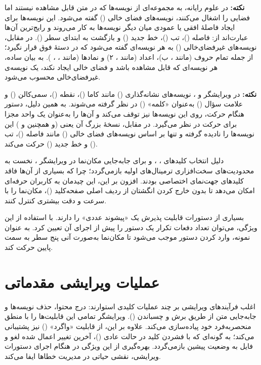 \begin{note}
\textbf{نکته:} در علوم رایانه، به مجموعه‌ای از نویسه‌ها که در متن قابل مشاهده نیستند اما فضایی را اشغال می‌کنند، نویسه‌های فضای خالی () گفته می‌شود. این نویسه‌ها برای ایجاد فاصلهٔ افقی یا عمودی میان دیگر نویسه‌ها به کار می‌روند و رایج‌ترین آن‌ها عبارت‌اند از: فاصله ()، تب ()، خط جدید () و بازگشت به ابتدای سطر (). در مقابل، نویسه‌های غیرفضای‌خالی () به هر نویسه‌ای گفته می‌شود که در دستهٔ فوق قرار نگیرد؛ از جمله تمام حروف (مانند ، ب)، اعداد (مانند ، ۲) و نمادها (مانند ، \cmd{\#}، ). به بیان ساده، هر نویسه‌ای که قابل مشاهده باشد و فضای خالی ایجاد نکند، یک نویسه‌ی غیرفضای‌خالی محسوب می‌شود.

\textbf{نکته:} در ویرایشگر  و ، نویسه‌های نشانه‌گذاری () مانند کاما (\cmd{,})، نقطه ()، سمی‌کالن (\cmd{;}) و علامت سؤال () به‌عنوان «کلمه» () در نظر گرفته می‌شوند. به همین دلیل، دستور  هنگام حرکت، روی این نویسه‌ها نیز توقف می‌کند و آن‌ها را به‌عنوان یک واحد مجزا برای حرکت در نظر می‌گیرد. در مقابل، نسخهٔ بزرگ آن یعنی  (و همچنین  و ) این نویسه‌ها را نادیده گرفته و تنها بر اساس نویسه‌های فضای خالی () مانند فاصله ()، تب () و خط جدید () حرکت می‌کند.
\end{note}

دلیل انتخاب کلیدهای ، ،  و  برای جابه‌جایی مکان‌نما در ویرایشگر ، نخست به محدودیت‌های سخت‌افزاری ترمینال‌های اولیه بازمی‌گردد؛ چرا که بسیاری از آن‌ها فاقد کلیدهای جهت‌نمای اختصاصی بودند. افزون بر این، این چیدمان به کاربران حرفه‌ای امکان می‌دهد تا بدون خارج کردن انگشتان از ردیف اصلی صفحه‌کلید ()، مکان‌نما را با سرعت و دقت بیشتری کنترل کنند.

بسیاری از دستورات  قابلیت پذیرش یک «پیشوند عددی» را دارند. با استفاده از این ویژگی، می‌توان تعداد دفعات تکرار یک دستور را پیش از اجرای آن تعیین کرد. به عنوان نمونه، وارد کردن دستور  موجب می‌شود تا مکان‌نما به‌صورت آنی پنج سطر به سمت پایین حرکت کند.

\section{عملیات ویرایشی مقدماتی}

اغلب فرآیندهای ویرایشی بر چند عملیات کلیدی استوارند: درج محتوا، حذف نویسه‌ها و جابه‌جایی متن از طریق برش و چسباندن (). ویرایشگر  تمامی این قابلیت‌ها را با منطق منحصربه‌فرد خود پیاده‌سازی می‌کند. علاوه بر این،  از قابلیت «واگرد» () نیز پشتیبانی می‌کند؛ به گونه‌ای که با فشردن کلید  در حالت عادی ()، آخرین تغییر اعمال شده لغو و فایل به وضعیت پیشین بازمی‌گردد. بهره‌گیری از این ویژگی در هنگام اجرای دستورات ویرایشی، نقشی حیاتی در مدیریت خطاها ایفا می‌کند.

